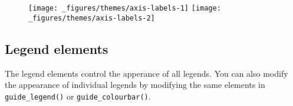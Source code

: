 \begin{Shaded}
\begin{Highlighting}[]
\StringTok{ }\NormalTok{(}
   \NormalTok{(}\NormalTok{, }\NormalTok{, }\NormalTok{), }
   \NormalTok{:}
\NormalTok{)}
\StringTok{ }\StringTok{ }\NormalTok{()}
\StringTok{ }
\StringTok{  }\NormalTok{(} \NormalTok{(} \NormalTok{-}\NormalTok{, } \NormalTok{, } \NormalTok{)) +}\StringTok{ }
\StringTok{  }\NormalTok{(}\NormalTok{) +}\StringTok{ }
\StringTok{  }\NormalTok{(}\NormalTok{)}
\end{Highlighting}
\end{Shaded}

\begin{figure}[H]
  \texttt{[image: \_figures/themes/axis-labels-1]}%
  \texttt{[image: \_figures/themes/axis-labels-2]}
\end{figure}

\subsection{Legend elements}

 

The legend elements control the apperance of all legends. You can also
modify the appearance of individual legends by modifying the same
elements in \texttt{guide\_legend()} or \texttt{guide\_colourbar()}.

